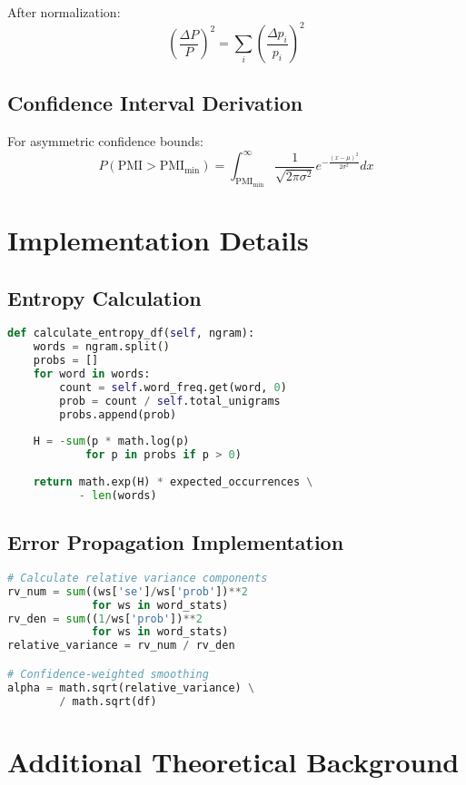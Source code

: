 \documentclass[12pt,a4paper]{article}
\begin{document}
After normalization:
\begin{equation}
    \left(\frac{\Delta P}{P}\right)^2 = \sum_i \left(\frac{\Delta p_i}{p_i}\right)^2
\end{equation}

\subsection{Confidence Interval Derivation}
For asymmetric confidence bounds:
\begin{equation}
    P(\text{PMI} > \text{PMI}_{\text{min}}) = \int_{\text{PMI}_{\text{min}}}^{\infty} \frac{1}{\sqrt{2\pi\sigma^2}} e^{-\frac{(x-\mu)^2}{2\sigma^2}} dx
\end{equation}

\section{Implementation Details}

\subsection{Entropy Calculation}
\begin{lstlisting}[language=Python]
def calculate_entropy_df(self, ngram):
    words = ngram.split()
    probs = []
    for word in words:
        count = self.word_freq.get(word, 0)
        prob = count / self.total_unigrams
        probs.append(prob)
    
    H = -sum(p * math.log(p) 
            for p in probs if p > 0)
    
    return math.exp(H) * expected_occurrences \
           - len(words)
\end{lstlisting}

\subsection{Error Propagation Implementation}
\begin{lstlisting}[language=Python]
# Calculate relative variance components
rv_num = sum((ws['se']/ws['prob'])**2 
             for ws in word_stats)
rv_den = sum((1/ws['prob'])**2 
             for ws in word_stats)
relative_variance = rv_num / rv_den

# Confidence-weighted smoothing
alpha = math.sqrt(relative_variance) \
        / math.sqrt(df)
\end{lstlisting}

\section{Additional Theoretical Background}
\end{document}

